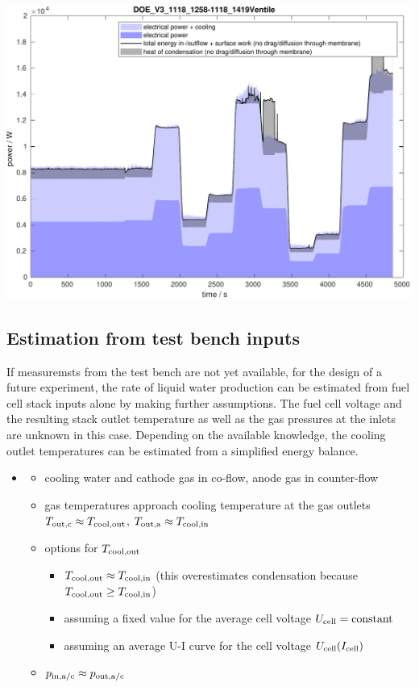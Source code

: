 \begin{itemize}
\begin{center}
       \includegraphics[scale=0.6]{./figures/energyBalance_DoE_v3}
       \end{center}
\end{itemize}
%
%
\subsection{Estimation from test bench inputs}
%
If measuremsts from the test bench are not yet available, \eg for the design of a future experiment, the rate of liquid water production can be estimated from fuel cell stack inputs alone by making further assumptions.
The fuel cell voltage and the resulting stack outlet temperature as well as the gas pressures at the inlets are unknown in this case.
Depending on the available knowledge, the cooling outlet temperatures can be estimated from a simplified energy balance.\smallskip
%
\begin{itemize}
   \item {}
     \begin{itemize}
      \item cooling water and cathode gas in co-flow, anode gas in counter-flow
      \item gas temperatures approach cooling temperature at the gas outlets\\
            $T_{\mathrm{out,c}} \approx T_{\mathrm{cool,out}}$, $T_{\mathrm{out,a}} \approx T_{\mathrm{cool,in}}$
      \item options for $T_{\mathrm{cool,out}}$
        \begin{itemize} 
          \item $T_{\mathrm{cool,out}} \approx T_{\mathrm{cool,in}}$ (this overestimates condensation because ${T_{\mathrm{cool,out}}\ge T_{\mathrm{cool,in}}}$)
          \item assuming a fixed value for the average cell voltage $U_{\mathrm{cell}}=\text{constant}$
          \item assuming an average U-I curve for the cell voltage $U_{\mathrm{cell}}(I_{\mathrm{cell}})$
        \end{itemize}
      \item $p_{\mathrm{in,a/c}} \approx p_{\mathrm{out,a/c}}$
     \end{itemize}
\end{itemize}
